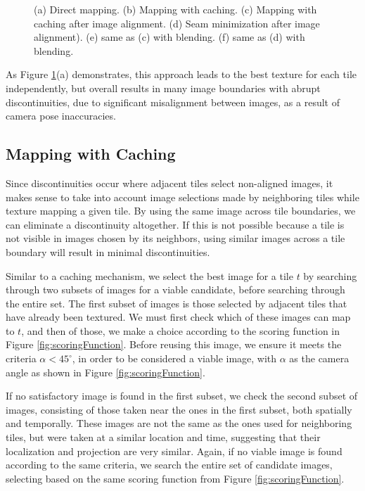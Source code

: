 \documentclass[10pt,twocolumn,letterpaper]{article}
\begin{document}
\begin{figure}[h!]
  \centering {}
  \caption{(a) Direct mapping. (b) Mapping with caching. (c) Mapping
    with caching after image alignment. (d) Seam minimization after
    image alignment). (e) same as (c) with blending. (f) same as (d)
    with blending.}
  \label{fig:compareAll}
\end{figure}


As Figure \ref{fig:compareAll}(a) demonstrates, this approach leads to
the best texture for each tile independently, but overall results in
many image boundaries with abrupt discontinuities, due to significant
misalignment between images, as a result of camera pose inaccuracies.

\subsection{Mapping with Caching}
\label{sec:mappingWithCaching}
Since discontinuities occur where adjacent tiles select non-aligned
images, it makes sense to take into account image selections made by
neighboring tiles while texture mapping a given tile. By using the
same image across tile boundaries, we can eliminate a discontinuity
altogether. If this is not possible because a tile is not visible in
images chosen by its neighbors, using similar images across a tile boundary will result in minimal discontinuities.

Similar to a caching mechanism, we select the best image for a tile
$t$ by searching through two subsets of images for a viable candidate,
before searching through the entire set. The first subset of images is
those selected by adjacent tiles that have already been textured. We
must first check which of these images can map to $t$, and then of
those, we make a choice according to the scoring function in Figure
\ref{fig:scoringFunction}. Before reusing this image, we ensure it
meets the criteria $\alpha < 45^\circ$, in order to be considered a
viable image, with $\alpha$ as the camera angle as shown in Figure
\ref{fig:scoringFunction}.

If no satisfactory image is found in the first subset, we check the
second subset of images, consisting of those taken near the ones in
the first subset, both spatially and temporally. These images are not
the same as the ones used for neighboring tiles, but were taken at a
similar location and time, suggesting that their localization and
projection are very similar. Again, if no viable image is found
according to the same criteria, we search the entire set of candidate
images, selecting based on the same scoring function from Figure
\ref{fig:scoringFunction}.
\end{document}
